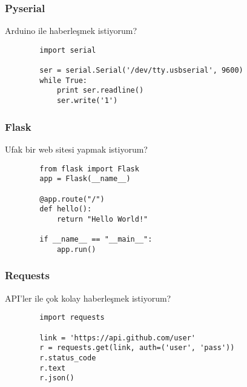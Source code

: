 \documentclass[10pt, compress]{beamer}
\begin{document}


\begin{frame}[fragile]
    \frametitle{Pyserial}
    \begin{center}
        Arduino ile haberleşmek istiyorum?
    
      \begin{verbatim}
        import serial
        
        ser = serial.Serial('/dev/tty.usbserial', 9600)
        while True:
            print ser.readline()
            ser.write('1')
      \end{verbatim}
      \end{center}  
\end{frame}


\begin{frame}[fragile]
    \frametitle{Flask}
    \begin{center}
        Ufak bir web sitesi yapmak istiyorum?
    \end{center}  
      \begin{verbatim}
        from flask import Flask
        app = Flask(__name__)
        
        @app.route("/")
        def hello():
            return "Hello World!"
        
        if __name__ == "__main__":
            app.run()
      \end{verbatim}
\end{frame}


\begin{frame}[fragile]
    \frametitle{Requests}
    \begin{center}
        API'ler ile çok kolay haberleşmek istiyorum?
    \end{center}  
      \begin{verbatim}
        import requests
        
        link = 'https://api.github.com/user'
        r = requests.get(link, auth=('user', 'pass'))
        r.status_code
        r.text
        r.json()
      \end{verbatim}
\end{frame}
\end{document}
